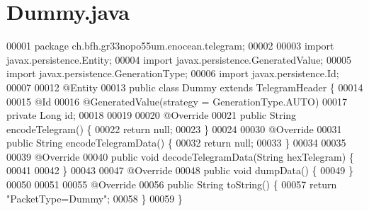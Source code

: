 \section{Dummy.\+java}
\label{Dummy_8java_source}

\begin{DoxyCode}
00001 \textcolor{keyword}{package }ch.bfh.gr33nopo55um.enocean.telegram;
00002 
00003 \textcolor{keyword}{import} javax.persistence.Entity;
00004 \textcolor{keyword}{import} javax.persistence.GeneratedValue;
00005 \textcolor{keyword}{import} javax.persistence.GenerationType;
00006 \textcolor{keyword}{import} javax.persistence.Id;
00007 
00012 @Entity
00013 \textcolor{keyword}{public} \textcolor{keyword}{class }Dummy \textcolor{keyword}{extends} TelegramHeader \{
00014 
00015     @Id
00016     @GeneratedValue(strategy = GenerationType.AUTO)
00017     private Long \textcolor{keywordtype}{id};
00018 
00019 
00020     @Override
00021     public String encodeTelegram() \{
00022         \textcolor{keywordflow}{return} null;
00023     \}
00024 
00030     @Override
00031     \textcolor{keyword}{public} String encodeTelegramData() \{
00032         \textcolor{keywordflow}{return} null;
00033     \}
00034 
00035 
00039     @Override
00040     \textcolor{keyword}{public} \textcolor{keywordtype}{void} decodeTelegramData(String hexTelegram) \{
00041 
00042     \}
00043 
00047     @Override
00048     \textcolor{keyword}{public} \textcolor{keywordtype}{void} dumpData() \{
00049     \}
00050 
00051 
00055     @Override
00056     \textcolor{keyword}{public} String toString() \{
00057         \textcolor{keywordflow}{return} \textcolor{stringliteral}{"PacketType=Dummy"};
00058     \}
00059 \}
\end{DoxyCode}

